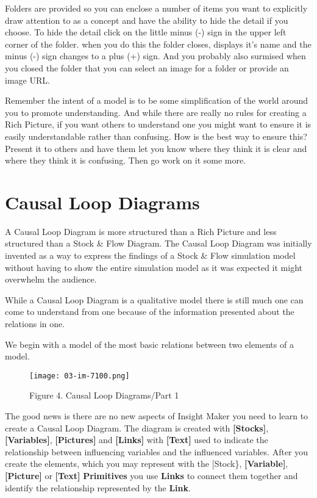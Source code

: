 \documentclass[]{memoir}
\makeatletter
\def\maxwidth{\ifdim\Gin@nat@width>\linewidth\linewidth
\else\Gin@nat@width\fi}
\let\Oldincludegraphics\includegraphics
\renewcommand{\includegraphics}[1]{\Oldincludegraphics[width=\maxwidth]{#1}}
\newcommand{\p}[1]{\textbf{{[}#1{]}}}
\renewcommand{\u}[1]{\textbf{#1}}
\makeatother
\begin{document}
Folders are provided so you can enclose a number of items you want to
explicitly draw attention to as a concept and have the ability to hide
the detail if you choose. To hide the detail click on the little minus
(-) sign in the upper left corner of the folder. when you do this the
folder closes, displays it's name and the minus (-) sign changes to a
plus (+) sign. And you probably also surmised when you closed the folder
that you can select an image for a folder or provide an image URL.

Remember the intent of a model is to be some simplification of the world
around you to promote understanding. And while there are really no rules
for creating a Rich Picture, if you want others to understand one you
might want to ensure it is easily understandable rather than confusing.
How is the best way to ensure this? Present it to others and have them
let you know where they think it is clear and where they think it is
confusing. Then go work on it some more.

\section{Causal Loop Diagrams}

A Causal Loop Diagram is more structured than a Rich Picture and less
structured than a Stock \& Flow Diagram. The Causal Loop Diagram was
initially invented as a way to express the findings of a Stock \& Flow
simulation model without having to show the entire simulation model as
it was expected it might overwhelm the audience.

While a Causal Loop Diagram is a qualitative model there is still much
one can come to understand from one because of the information presented
about the relations in one.

We begin with a model of the most basic relations between two elements
of a model.

\begin{figure}[htbp]
\centering
\texttt{[image: 03-im-7100.png]}
\caption{Figure 4. Causal Loop Diagrams/Part 1}
\end{figure}

The good news is there are no new aspects of Insight Maker you need to
learn to create a Causal Loop Diagram. The diagram is created with
\p{Stocks}, \p{Variables}, \p{Pictures} and \p{Links} with \p{Text} used
to indicate the relationship between influencing variables and the
influenced variables. After you create the elements, which you may
represent with the {[}Stock\}, \p{Variable}, \p{Picture} or \p{Text}
\u{Primitives} you use \u{Links} to connect them together and identify
the relationship represented by the \u{Link}.
\end{document}
